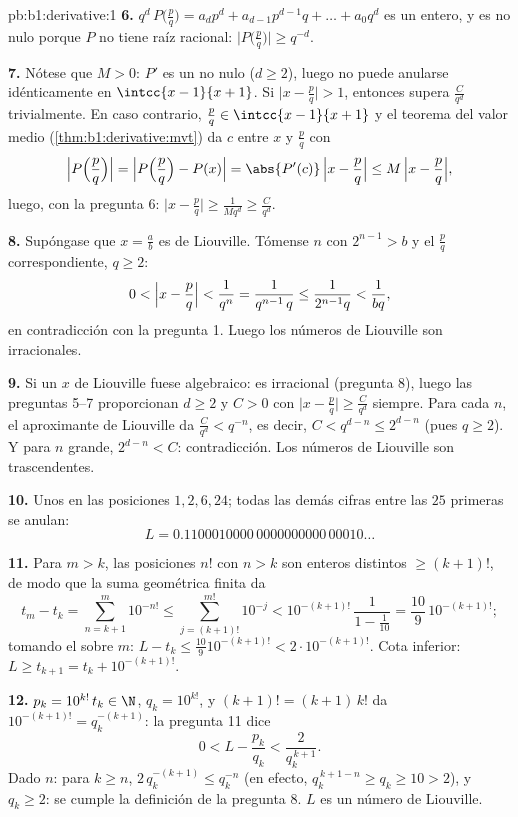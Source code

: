 \begin{solution}{pb:b1:derivative:1}
\textbf{6.} $q^d\,P\bigl(\frac pq\bigr) = a_d p^d + a_{d-1}
p^{d-1} q + \dots + a_0 q^d$ es un entero, y es no nulo porque $P$ no
tiene raíz racional: $\bigl|P\bigl(\frac pq\bigr)\bigr| \geq q^{-d}$.

\textbf{7.} Nótese que $M > 0$: $P'$ es un  no nulo
($d \geq 2$), luego no puede anularse idénticamente en
$\intcc{x-1}{x+1}$. Si $\bigl|x - \frac pq\bigr| > 1$, entonces
supera $\frac{C}{q^d}$ trivialmente. En caso contrario,
$\frac pq \in \intcc{x-1}{x+1}$ y el teorema del valor medio
(\cref{thm:b1:derivative:mvt}) da $c$ entre $x$ y $\frac pq$ con
\[
\Bigl|P\Bigl(\frac pq\Bigr)\Bigr|
= \Bigl|P\Bigl(\frac pq\Bigr) - P(x)\Bigr|
= \abs{P'(c)}\,\Bigl|x - \frac pq\Bigr|
\leq M\,\Bigl|x - \frac pq\Bigr| ,
\]
luego, con la pregunta 6: $\bigl|x - \frac pq\bigr| \geq
\frac{1}{Mq^d} \geq \frac{C}{q^d}$.

\textbf{8.} Supóngase que $x = \frac ab$ es de Liouville. Tómense $n$
con $2^{n-1} > b$ y el $\frac pq$ correspondiente, $q \geq 2$:
\[
0 < \Bigl|x - \frac pq\Bigr| < \frac{1}{q^n}
= \frac{1}{q^{n-1}\,q} \leq \frac{1}{2^{n-1} q} <
\frac{1}{bq} ,
\]
en contradicción con la pregunta 1. Luego los números de Liouville son irracionales.

\textbf{9.} Si un $x$ de Liouville fuese algebraico: es irracional
(pregunta 8), luego las preguntas 5--7 proporcionan $d \geq 2$ y
$C > 0$ con $\bigl|x - \frac pq\bigr| \geq \frac{C}{q^d}$ siempre.
Para cada $n$, el aproximante de Liouville da
$\frac{C}{q^d} < q^{-n}$, es decir, $C < q^{d-n} \leq 2^{d-n}$ (pues
$q \geq 2$). Y para $n$ grande, $2^{d-n} < C$: contradicción. Los
números de Liouville son trascendentes.

\textbf{10.} Unos en las posiciones $1, 2, 6, 24$; todas las demás
cifras entre las $25$ primeras se anulan:
\[
L = 0.1100010000\,0000000000\,00010\dots
\]

\textbf{11.} Para $m > k$, las posiciones $n!$ con $n > k$ son
enteros distintos $\geq (k+1)!$, de modo que la suma geométrica
finita da
\[
t_m - t_k = \sum_{n=k+1}^{m} 10^{-n!}
\leq \sum_{j = (k+1)!}^{m!} 10^{-j}
< 10^{-(k+1)!}\,\frac{1}{1 - \frac1{10}}
= \frac{10}{9}\,10^{-(k+1)!} ;
\]
tomando el  sobre $m$:
$L - t_k \leq \frac{10}{9}10^{-(k+1)!} < 2\cdot10^{-(k+1)!}$. Cota
inferior: $L \geq t_{k+1} = t_k + 10^{-(k+1)!}$.

\textbf{12.} $p_k = 10^{k!}\,t_k \in \N$, $q_k = 10^{k!}$, y
$(k+1)! = (k+1)\,k!$ da $10^{-(k+1)!} = q_k^{-(k+1)}$: la
pregunta 11 dice
\[
0 < L - \frac{p_k}{q_k} < \frac{2}{q_k^{\,k+1}} .
\]
Dado $n$: para $k \geq n$, $2\,q_k^{-(k+1)} \leq q_k^{-n}$ (en
efecto, $q_k^{\,k+1-n} \geq q_k \geq 10 > 2$), y $q_k \geq 2$: se
cumple la definición de la pregunta 8. $L$ es un número de Liouville.


\end{solution}
